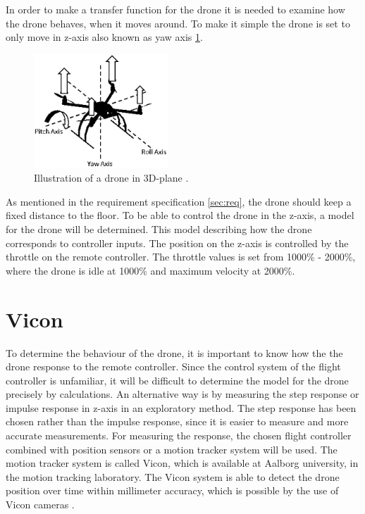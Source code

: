 In order to make a transfer function for the drone it is needed to examine how the drone behaves, when it moves around. To make it simple the drone is set to only move in z-axis also known as yaw axis \ref{fig:z_axis}.
\begin{figure}[H]
    \centering
    \includegraphics[width=0.45\textwidth]{figures/ch_movement/z-axis.png}
    \caption{Illustration of a drone in 3D-plane \cite{drone_axis}.}
    \label{fig:z_axis}
\end{figure}

 As mentioned in the requirement specification \ref{sec:req}, the drone should keep a fixed distance to the floor. To be able to control the drone in the z-axis, a model for the drone will be determined. This model describing how the drone corresponds to controller inputs. The position on the z-axis is controlled by the throttle on the remote controller. The throttle values is set from 1000\% - 2000\%, where the drone is idle at 1000\% and maximum velocity at 2000\%.  

\section{Vicon}\label{s:vicon}
To determine the behaviour of the drone, it is important to know how the the drone response to the remote controller. 
Since the control system of the flight controller is unfamiliar, it will be difficult to determine the model for the drone precisely by calculations. An alternative way is by measuring the step response or impulse response in z-axis in an exploratory method. The step response has been chosen rather than the impulse response, since it is easier to measure and more accurate measurements. For measuring the response, the chosen flight controller combined with position sensors or a motion tracker system will be used. The motion tracker system is called Vicon, which is available at Aalborg university, in the motion tracking laboratory. The Vicon system is able to detect the drone position over time within millimeter accuracy, which is possible by the use of Vicon cameras \cite{Vicon}.


